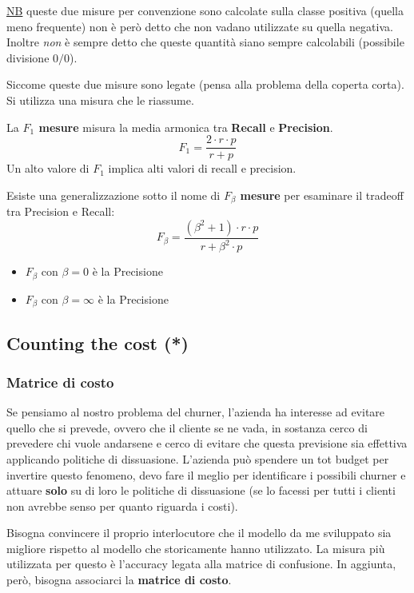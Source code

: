 \underline{NB} queste due misure per convenzione sono calcolate sulla classe positiva (quella meno frequente) non \`e per\`o detto che non vadano utilizzate su quella negativa. Inoltre \textit{non} \`e sempre detto che queste quantit\`a siano sempre calcolabili (possibile divisione $0/0$).

Siccome queste due misure sono legate (pensa alla problema della coperta corta). Si utilizza una misura che le riassume.
\begin{defn}
	La \textbf{$F_1$ mesure} misura la media armonica tra \textbf{Recall} e \textbf{Precision}. 
	\[ F_1 = \frac{2 \cdot r \cdot p}{r + p}\]
	Un alto valore di $F_1$ implica alti valori di recall e precision.

\end{defn}	
Esiste una generalizzazione sotto il nome di \textbf{$F_\beta$ mesure} per esaminare il tradeoff tra Precision e Recall:
	\[ F_\beta = \frac{(\beta^2 + 1) \cdot r \cdot p}{r + \beta^2 \cdot p} \]
\begin{itemize}
	\item $F_\beta$ con $\beta = 0$ \`e la Precisione
	\item $F_\beta$ con $\beta = \infty$ \`e la Precisione	
\end{itemize}


\subsection{Counting the cost (*)}

\subsubsection{Matrice di costo}
Se pensiamo al nostro problema del churner, l'azienda ha interesse ad evitare quello che si prevede, ovvero che il cliente se ne vada, in sostanza cerco di prevedere chi vuole andarsene e cerco di evitare che questa previsione sia effettiva applicando politiche di dissuasione. L'azienda pu\`o spendere un tot budget per invertire questo fenomeno, devo fare il meglio per identificare i possibili churner e attuare \textbf{solo} su di loro le politiche di dissuasione (se lo facessi per tutti i clienti non avrebbe senso per quanto riguarda i costi).

Bisogna convincere il proprio interlocutore che il modello da me sviluppato sia migliore rispetto al modello che storicamente hanno utilizzato. La misura più utilizzata per questo è l'accuracy legata alla matrice di confusione. In aggiunta, però, bisogna associarci la \textbf{matrice di costo}. 

